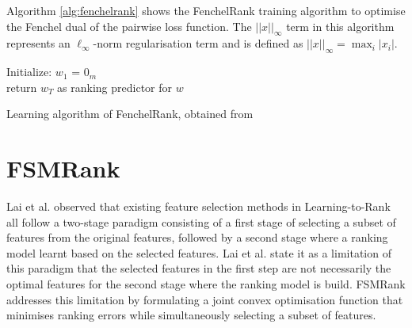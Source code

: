 Algorithm \ref{alg:fenchelrank} shows the FenchelRank training algorithm to optimise the Fenchel dual of the pairwise loss function. The $||x||_\infty$ term in this algorithm represents an $\ell_\infty$-norm regularisation term and is defined as $||x||_\infty=\max_{i}|x_i|$.\\

\LinesNumbered
\begin{algorithm}[H]
 Initialize: $w_1$ = $0_m$\\
 return $w_{T}$ as ranking predictor for $w$
 \caption{Learning algorithm of FenchelRank, obtained from \cite{Lai2013}}
 \label{alg:fenchelrank}
\end{algorithm}

\section{FSMRank}
Lai et al. \cite{Lai2013c} observed that existing feature selection methods in Learning-to-Rank all follow a two-stage paradigm consisting of a first stage of selecting a subset of features from the original features, followed by a second stage where a ranking model learnt based on the selected features. Lai et al. \cite{Lai2013c} state it as a limitation of this paradigm that the selected features in the first step are not necessarily the optimal features for the second stage where the ranking model is build. FSMRank \cite{Lai2013c} addresses this limitation by formulating a joint convex optimisation function that minimises ranking errors while simultaneously selecting a subset of features.\\

